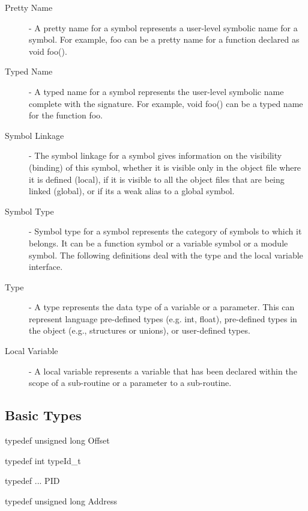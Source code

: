 \begin{description}
\item[Pretty Name] - A pretty name for a symbol represents a user-level symbolic name for a symbol. For example, foo can be a pretty name for a function declared as void foo().
\item[Typed Name] - A typed name for a symbol represents the user-level symbolic name complete with the signature. For example, void foo() can be a typed name for the function foo.
\item[Symbol Linkage] - The symbol linkage for a symbol gives information on the visibility (binding) of this symbol, whether it is visible only in the object file where it is defined (local), if it is visible to all the object files that are being linked (global), or if its a weak alias to a global symbol.
\item[Symbol Type] - Symbol type for a symbol represents the category of symbols to which it belongs. It can be a function symbol or a variable symbol or a module symbol.
The following definitions deal with the type and the local variable interface.
\item[Type] - A type represents the data type of a variable or a parameter. This can represent language pre-defined types (e.g. int, float), pre-defined types in the object (e.g., structures or unions), or user-defined types.
\item[Local Variable] - A local variable represents a variable that has been declared within the scope of a sub-routine or a parameter to a sub-routine.
\end{description}

\subsection{Basic Types}

\begin{apient}
typedef unsigned long Offset
\end{apient}
\begin{apient}
typedef int typeId_t
\end{apient}
\begin{apient}
typedef ... PID
\end{apient}
\begin{apient}
typedef unsigned long Address
\end{apient}

